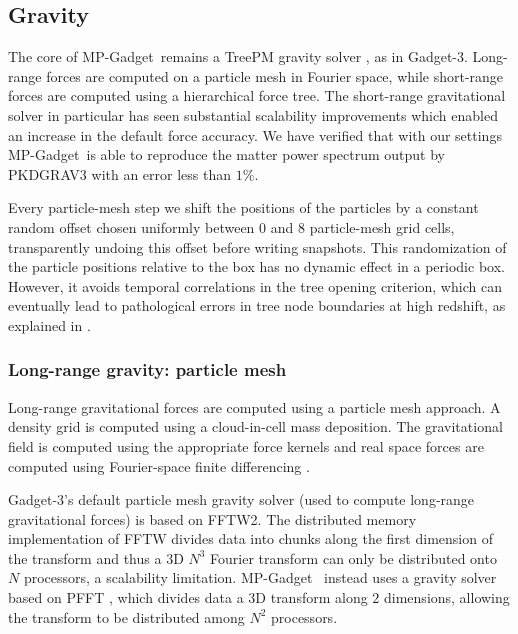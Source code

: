 \documentclass[fleqn,usenatbib]{mnras}
\newcommand{\software}[1]{{\small #1}}
\newcommand{\mpgadget}{\software{MP-Gadget}}
\begin{document}
\subsection{Gravity}
\label{sec:gravity}
The core of \mpgadget~remains a TreePM gravity solver \citep{Xu:1995, Bagla:2002, Springel:2005}, as in Gadget-3. Long-range forces are computed on a particle mesh in Fourier space, while short-range forces are computed using a hierarchical force tree. The short-range gravitational solver in particular has seen substantial scalability improvements which enabled an increase in the default force accuracy. We have verified that with our settings \mpgadget~is able to reproduce the matter power spectrum output by PKDGRAV3 \cite{2016JCAP...04..047S} with an error less than $1\%$.

Every particle-mesh step we shift the positions of the particles by a constant random offset chosen uniformly between $0$ and $8$ particle-mesh grid cells, transparently undoing this offset before writing snapshots. This randomization of the particle positions relative to the box has no dynamic effect in a periodic box. However, it avoids temporal correlations in the tree opening criterion, which can eventually lead to pathological errors in tree node boundaries at high redshift, as explained in \cite{2020arXiv201003567S}.

\subsubsection{Long-range gravity: particle mesh}

Long-range gravitational forces are computed using a particle mesh approach. A density grid is computed using a cloud-in-cell mass deposition. The gravitational field is computed using the appropriate force kernels and real space forces are computed using Fourier-space finite differencing \citep[as in the HACC code:][]{2014arXiv1410.2805H}.

Gadget-3's default particle mesh gravity solver
(used to compute long-range gravitational forces) is based on FFTW2. The distributed memory implementation of FFTW divides data into chunks along the first dimension of the transform and thus a 3D $N^3$ Fourier transform can only be distributed onto $N$ processors, a scalability limitation. \mpgadget~ instead uses a gravity solver based on \software{PFFT} \citep{doi:10.1137/120885887}, which divides data a 3D transform along $2$ dimensions, allowing the transform to be distributed among $N^2$ processors.
\end{document}
